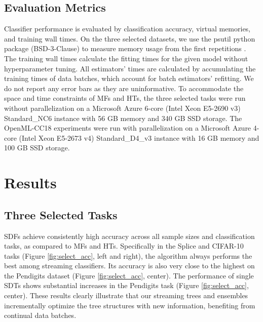 \subsection{Evaluation Metrics}
Classifier performance is evaluated by classification accuracy, virtual memories, and training wall times. 
On the three selected datasets, we use the psutil python package (BSD-3-Clause) to measure memory usage from the first repetitions
\citep{rodola_giampaolopsutil_2022}.
The training wall times calculate the fitting times for the given model without hyperparameter tuning. All estimators' times are calculated by accumulating the training times of data batches, which account for batch estimators' refitting. We do not report any error bars as they are uninformative. 
To accommodate the space and time constraints of MFs and HTs, the three selected tasks were run without parallelization on a Microsoft Azure 6-core (Intel Xeon E5-2690 v3) Standard\_NC6 instance with 56 GB memory and 340 GB SSD storage.
The OpenML-CC18 experiments were run with parallelization on a Microsoft Azure 4-core (Intel Xeon E5-2673 v4) Standard\_D4\_v3 instance with 16 GB memory and 100 GB SSD storage.

\section{Results}
\label{results}

\subsection{Three Selected Tasks}
\label{results:select}
SDFs achieve consistently high accuracy across all sample sizes and classification tasks, as compared to MFs and HTs. Specifically in the Splice and CIFAR-10 tasks (Figure \ref{fig:select_acc}, left and right), the algorithm always performs the best among streaming classifiers. Its accuracy is also very close to the highest on the Pendigits dataset (Figure \ref{fig:select_acc}, center). 
The performance of single SDTs shows substantial increases in the Pendigits task (Figure \ref{fig:select_acc}, center). 
These results clearly illustrate that our streaming trees and ensembles incrementally optimize the tree structures with new information, benefiting from continual data batches.

